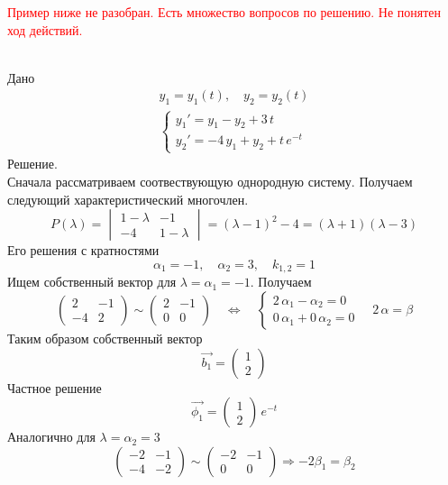 \textcolor{red}{Пример ниже не разобран. Есть множество вопросов по решению. Не понятен ход действий.}
\begin{Example}~\\
    Дано
    \begin{gather*}
        y_1=y_1(t), \quad y_2=y_2(t)\\
        \begin{cases}
            y_1' = y_1 - y_2 + 3\,t\\
            y_2' = -4\,y_1 + y_2 + t\,e^{-t}
        \end{cases}
    \end{gather*}
    Решение.\\
    Сначала рассматриваем соотвествующую однородную систему. Получаем следующий характеристический многочлен.
    \[
        P(\lambda)=\begin{vmatrix} 1-\lambda & -1\\ -4 & 1-\lambda\end{vmatrix}=(\lambda-1)^2-4=(\lambda+1)(\lambda-3)
    \]
    Его решения с кратностями
    \[
        \alpha_1 = -1, \quad \alpha_2 = 3, \quad k_{1,2} = 1
    \]
    Ищем собственный вектор для $\lambda=\alpha_1=-1$. Получаем
    \[
        \begin{pmatrix} 2 & -1\\ -4 & 2\end{pmatrix}\sim \begin{pmatrix} 2 & -1\\ 0 & 0\end{pmatrix} \quad \Leftrightarrow \quad 
        \begin{cases}
            2\,\alpha_1 - \alpha_2 = 0\\
            0\,\alpha_1 + 0\,\alpha_2 = 0
        \end{cases}
        \quad 2\,\alpha = \beta
    \]
    Таким образом собственный вектор
    \[
    \vec{b_1}= \begin{pmatrix} 1\\ 2 \end{pmatrix}
    \]
    Частное решение
    \[ 
        \vec{\phi_1} = \begin{pmatrix} 1 \\ 2 \end{pmatrix}\,e^{-t}
    \]
    Аналогично для $\lambda=\alpha_2=3$
    \[
        \begin{pmatrix} -2 & -1\\ -4 & -2\end{pmatrix} \sim \begin{pmatrix} -2 & -1 \\ 0 & 0\end{pmatrix} \Rightarrow -2\beta_1 = \beta_2
\]
\end{Example}
